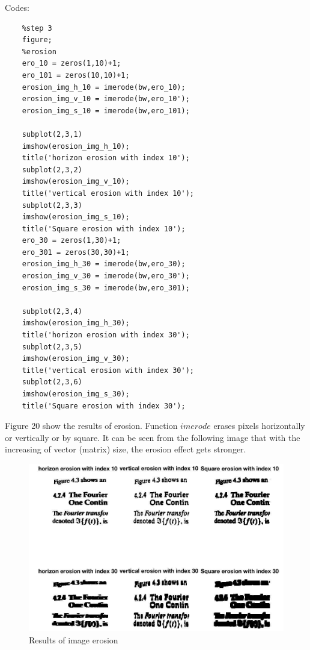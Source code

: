 \documentclass{article}
\begin{document}
Codes:
\begin{lstlisting}
    %step 3
    figure;
    %erosion
    ero_10 = zeros(1,10)+1;
    ero_101 = zeros(10,10)+1;
    erosion_img_h_10 = imerode(bw,ero_10);
    erosion_img_v_10 = imerode(bw,ero_10');
    erosion_img_s_10 = imerode(bw,ero_101);
    
    subplot(2,3,1)
    imshow(erosion_img_h_10);
    title('horizon erosion with index 10');
    subplot(2,3,2)
    imshow(erosion_img_v_10);
    title('vertical erosion with index 10');
    subplot(2,3,3)
    imshow(erosion_img_s_10);
    title('Square erosion with index 10');
    ero_30 = zeros(1,30)+1;
    ero_301 = zeros(30,30)+1;
    erosion_img_h_30 = imerode(bw,ero_30);
    erosion_img_v_30 = imerode(bw,ero_30');
    erosion_img_s_30 = imerode(bw,ero_301);
    
    subplot(2,3,4)
    imshow(erosion_img_h_30);
    title('horizon erosion with index 30');
    subplot(2,3,5)
    imshow(erosion_img_v_30);
    title('vertical erosion with index 30');
    subplot(2,3,6)
    imshow(erosion_img_s_30);
    title('Square erosion with index 30');
\end{lstlisting}

Figure 20 show the results of erosion. Function $imerode$ erases pixels horizontally or vertically or by square. It can be seen from the following image that with the increasing of vector (matrix) size, the erosion effect gets stronger. 

\begin{figure}[htbp]
    \centering
    \includegraphics[scale = 0.28]{fig17.jpg}
    \caption{Results of image erosion}
    \label{fig17}
\end{figure}
\end{document}
